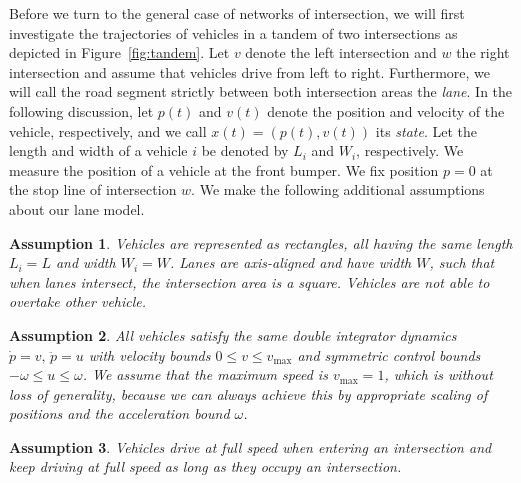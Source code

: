 \documentclass[a4paper]{article}
\theoremstyle{definition}
\theoremstyle{plain}
\newtheorem{assump}{Assumption\hspace{0.25em}\ignorespaces}
\begin{document}
Before we turn to the general case of networks of intersection, we will first
investigate the trajectories of vehicles in a tandem of two intersections as
depicted in Figure~\ref{fig:tandem}. Let $v$ denote the left intersection and
$w$ the right intersection and assume that vehicles drive from left to right.
Furthermore, we will call the road segment strictly between both intersection
areas the \textit{lane}. In the following discussion, let $p(t)$ and $v(t)$ denote the
position and velocity of the vehicle, respectively, and we call
$x(t) = (p(t), v(t))$ its \textit{state}. Let the length and width of a vehicle
$i$ be denoted by $L_{i}$ and $W_{i}$, respectively. We measure the position of
a vehicle at the front bumper. We fix position $p=0$ at the stop line of
intersection $w$.
%
We make the following additional assumptions about our lane model.

\begin{assump}
  \label{assump:same_geometry}
  Vehicles are represented as rectangles, all having the same length $L_{i} = L$
  and width $W_{i} = W$. Lanes are axis-aligned and have width $W$, such that
  when lanes intersect, the intersection area is a square.
  Vehicles are not able to overtake other vehicle.
\end{assump}

\begin{assump}
  All vehicles satisfy the same double integrator dynamics
  $\dot{p} = v, \, \ddot{p} = u$ with velocity bounds
  $0 \leq v \leq v_{\max}$ and symmetric control
  bounds $-\omega \leq u \leq \omega$.
  We assume that the maximum
  speed is $v_{\max} = 1$, which is without loss of generality, because we can
  always achieve this by appropriate scaling of positions and the acceleration
  bound $\omega$.
\end{assump}

\begin{assump}
  \label{assump:full_speed}
  Vehicles drive at full speed when entering
  an intersection and keep driving at full speed as long as they occupy an
  intersection.
\end{assump}
\end{document}
